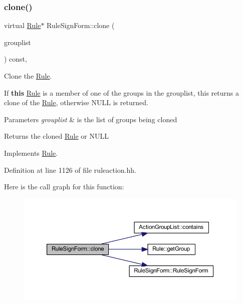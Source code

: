 \subsubsection{\texorpdfstring{clone()}{clone()}}
{\footnotesize\ttfamily virtual \mbox{\hyperlink{class_rule}{Rule}}$\ast$ Rule\+Sign\+Form\+::clone (\begin{DoxyParamCaption}\item[{const \mbox{\hyperlink{class_action_group_list}{Action\+Group\+List}} \&}]{grouplist }\end{DoxyParamCaption}) const\hspace{0.3cm}{\ttfamily [inline]}, {\ttfamily [virtual]}}



Clone the \mbox{\hyperlink{class_rule}{Rule}}. 

If {\bfseries{this}} \mbox{\hyperlink{class_rule}{Rule}} is a member of one of the groups in the grouplist, this returns a clone of the \mbox{\hyperlink{class_rule}{Rule}}, otherwise N\+U\+LL is returned. 
\begin{DoxyParams}{Parameters}
{\em grouplist} & is the list of groups being cloned \\
\hline
\end{DoxyParams}
\begin{DoxyReturn}{Returns}
the cloned \mbox{\hyperlink{class_rule}{Rule}} or N\+U\+LL 
\end{DoxyReturn}


Implements \mbox{\hyperlink{class_rule_a70de90a76461bfa7ea0b575ce3c11e4d}{Rule}}.



Definition at line 1126 of file ruleaction.\+hh.

Here is the call graph for this function\+:
\nopagebreak
\begin{figure}[H]
\begin{center}
\leavevmode
\includegraphics[width=350pt]{class_rule_sign_form_a41eb49ee67b70035b228b576ad7ab1e4_cgraph}
\end{center}
\end{figure}
\mbox{\label{class_rule_sign_form_a185d3091b7022585408a27668728d370}} 
